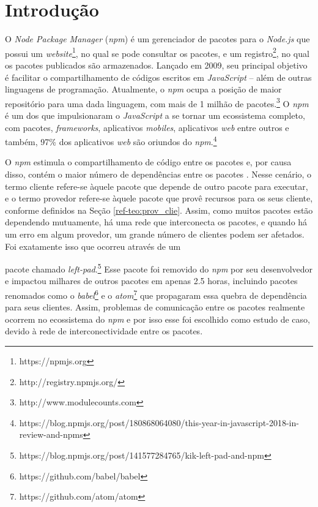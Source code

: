 \chapter{Introdução}
\label{cap:introducao}

O \textit{Node Package Manager} (\textit{npm}) é um gerenciador de pacotes para o \textit{Node.js} que possui um \textit{website}\footnote{https://npmjs.org}, no qual se pode consultar os pacotes, e um registro\footnote{http://registry.npmjs.org/}, no qual os pacotes publicados são armazenados. Lançado em 2009, seu principal objetivo é facilitar o compartilhamento de códigos escritos em \textit{JavaScript} -- além de outras linguagens de programação. Atualmente, o \textit{npm} ocupa a posição de maior repositório para uma dada linguagem, com mais de 1 milhão de pacotes.\footnote{http://www.modulecounts.com} O \textit{npm} é um dos que impulsionaram o \textit{JavaScript} a se tornar um ecossistema completo, com pacotes, \textit{frameworks}, aplicativos \textit{mobiles}, aplicativos \textit{web} entre outros \cite{introduction:npm} e também,  97\% dos aplicativos \textit{web} são oriundos do \textit{npm}.\footnote{https://blog.npmjs.org/post/180868064080/this-year-in-javascript-2018-in-review-and-npms}

O \textit{npm} estimula o compartilhamento de código entre os pacotes e, por causa disso, contém o maior número de dependências entre os pacotes \cite{teorical_reference:npm_2}. Nesse cenário, o termo cliente refere-se àquele pacote que depende de outro pacote para executar, e o termo provedor refere-se àquele pacote que provê recursos para os seus cliente, conforme definidos na Seção \ref{ref-teo:prov_clie}. Assim, como muitos pacotes estão dependendo mutuamente, há uma rede que interconecta os pacotes, e quando há um erro em algum provedor, um grande número de clientes podem ser afetados. Foi exatamente isso que ocorreu através de um 


pacote chamado \textit{left-pad}.\footnote{https://blog.npmjs.org/post/141577284765/kik-left-pad-and-npm} Esse pacote foi removido do \textit{npm} por seu desenvolvedor e impactou milhares de outros pacotes em apenas 2.5 horas, incluindo pacotes renomados como o \textit{babel}\footnote{https://github.com/babel/babel} e o \textit{atom}\footnote{https://github.com/atom/atom} que propagaram essa quebra de dependência para seus clientes. Assim, problemas de comunicação entre os pacotes realmente ocorrem no ecossistema do \textit{npm} e por isso esse foi escolhido como estudo de caso, devido à rede de interconectividade entre os pacotes.

